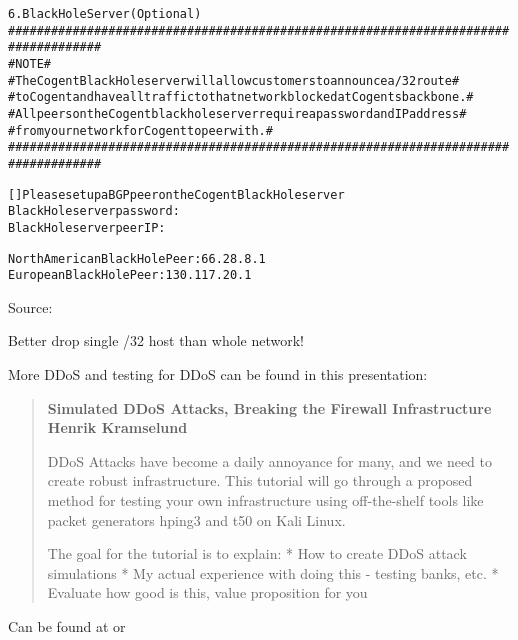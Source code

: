 \documentclass[Screen16to9,17pt]{foils}
\begin{document}

\begin{alltt}\footnotesize
6.  Black Hole Server (Optional)
   ###################################################################################
   #                           NOTE                                                  #
   #  The Cogent Black Hole server will allow customers to announce a /32 route      #
   #  to Cogent and have all traffic to that network blocked at Cogents backbone.    #
   #  All peers on the Cogent black hole server require a password and IP address    #
   #  from your network for Cogent to peer with.                                     #
   ###################################################################################

       [   ]  Please set up a BGP peer on the Cogent Black Hole server
       Black Hole server password:
       Black Hole server peer IP:

       North American Black Hole Peer:  66.28.8.1
       European Black Hole Peer:  130.117.20.1
\end{alltt}

Source:\\
{\footnotesize{}}

\centerline{Better drop single /32 host than whole network!}


More DDoS and testing for DDoS can be found in this presentation:
\begin{quote}\footnotesize{\bf
Simulated DDoS Attacks, Breaking the Firewall Infrastructure
Henrik Kramselund}

DDoS Attacks have become a daily annoyance for many, and we need to create robust infrastructure. This tutorial will go through a proposed method for testing your own infrastructure using off-the-shelf tools like packet generators hping3 and t50 on Kali Linux.

The goal for the tutorial is to explain:
* How to create DDoS attack simulations
* My actual experience with doing this - testing banks, etc.
* Evaluate how good is this, value proposition for you
\end{quote}

{\small Can be found at  or \\
}
\end{document}

